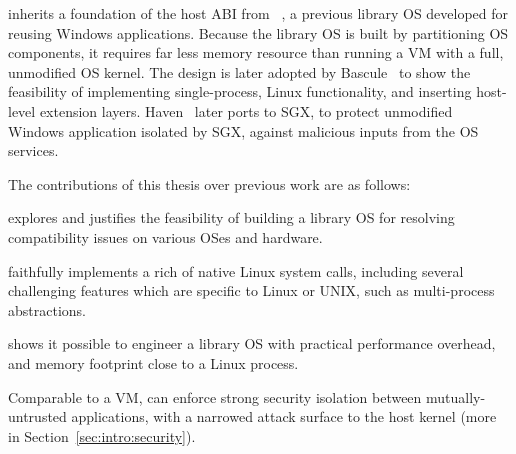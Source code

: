 \graphene{} inherits 
a foundation of the host ABI from \drawbridge{}~\cite{porter11drawbridge},
a previous library OS developed for reusing 
Windows applications.
Because the library OS is built by partitioning OS components,
it requires far less memory resource than running a VM with a full, unmodified OS kernel.
The \drawbridge{} design is later adopted by Bascule~\cite{baumann13bascule}
to show the feasibility of implementing single-process, Linux functionality, and inserting host-level extension layers.
Haven~\cite{baumann14haven} later ports \drawbridge{} to SGX,
to protect unmodified Windows application isolated by SGX, against malicious inputs from the OS services.


The contributions of this thesis over previous work are as follows:
\begin{compactenum}
\item \graphene{} explores and justifies the feasibility of building a library OS for resolving compatibility issues on various OSes and hardware.
\item \graphene{} faithfully implements a rich of native Linux system calls, including several challenging features which are specific to Linux or UNIX,
such as multi-process abstractions.
\item \graphene{} shows it possible to engineer a library OS
with practical performance overhead,
and memory footprint close to a Linux process.
\item Comparable to a VM, \graphene{} can enforce strong security isolation
between mutually-untrusted applications,
with a narrowed attack surface to the host kernel (more in Section~\ref{sec:intro:security}).
\end{compactenum}


